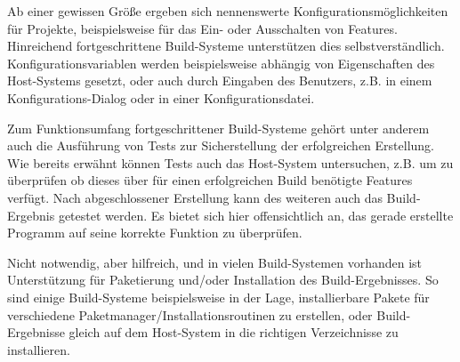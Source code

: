 Ab einer gewissen Größe ergeben sich nennenswerte
Konfigurationsmöglichkeiten für Projekte, beispielsweise für das Ein- oder
Ausschalten von Features. Hinreichend fortgeschrittene Build-Systeme
unterstützen dies selbstverständlich. Konfigurationsvariablen werden
beispielsweise abhängig von Eigenschaften des Host-Systems gesetzt, oder auch
durch Eingaben des Benutzers, z.B. in einem Konfigurations-Dialog oder in einer
Konfigurationsdatei.

%
Zum Funktionsumfang fortgeschrittener Build-Systeme gehört unter anderem auch
die Ausführung von Tests zur Sicherstellung der erfolgreichen Erstellung. Wie
bereits erwähnt können Tests auch das Host-System untersuchen, z.B. um zu
überprüfen ob dieses über für einen erfolgreichen Build benötigte Features
verfügt. Nach abgeschlossener Erstellung kann des weiteren auch das
Build-Ergebnis getestet werden. Es bietet sich hier offensichtlich an, das
gerade erstellte Programm auf seine korrekte Funktion zu überprüfen.

Nicht notwendig, aber hilfreich, und in vielen Build-Systemen vorhanden ist
Unterstützung für Paketierung und/oder Installation des Build-Ergebnisses. So
sind einige Build-Systeme beispielsweise in der Lage, installierbare Pakete für
verschiedene Paketmanager/Installationsroutinen zu erstellen, oder
Build-Ergebnisse gleich auf dem Host-System in die richtigen Verzeichnisse zu
installieren.
